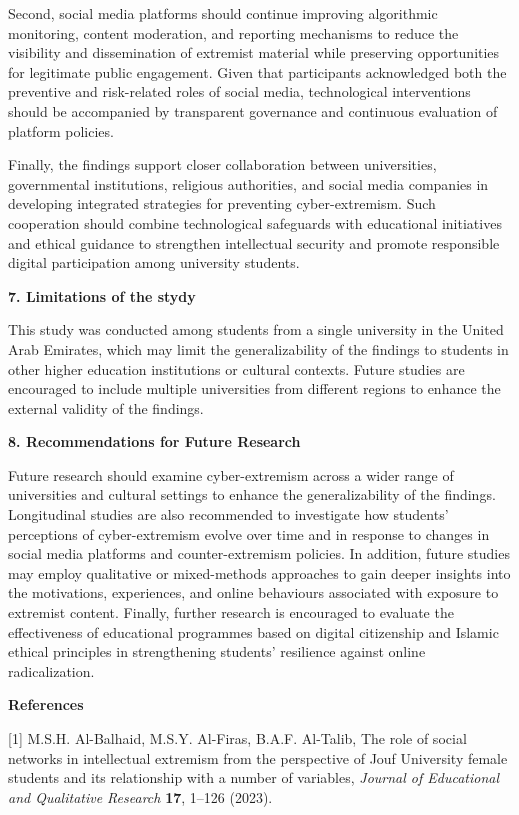 \documentclass[11pt,a4paper]{article}
\begin{document}
	Second, social media platforms should continue improving algorithmic monitoring, content moderation, and reporting mechanisms to reduce the visibility and dissemination of extremist material while preserving opportunities for legitimate public engagement. Given that participants acknowledged both the preventive and risk-related roles of social media, technological interventions should be accompanied by transparent governance and continuous evaluation of platform policies.
	
	Finally, the findings support closer collaboration between universities, governmental institutions, religious authorities, and social media companies in developing integrated strategies for preventing cyber-extremism. Such cooperation should combine technological safeguards with educational initiatives and ethical guidance to strengthen intellectual security and promote responsible digital participation among university students.
	
	\textbf{7. Limitations of the stydy}
	
	This study was conducted among students from a single university in the United Arab Emirates, which may limit the generalizability of the findings to students in other higher education institutions or cultural contexts. Future studies are encouraged to include multiple universities from different regions to enhance the external validity of the findings.
	
	\textbf{8. Recommendations for Future Research}
	
	Future research should examine cyber-extremism across a wider range of universities and cultural settings to enhance the generalizability of the findings. Longitudinal studies are also recommended to investigate how students' perceptions of cyber-extremism evolve over time and in response to changes in social media platforms and counter-extremism policies. In addition, future studies may employ qualitative or mixed-methods approaches to gain deeper insights into the motivations, experiences, and online behaviours associated with exposure to extremist content. Finally, further research is encouraged to evaluate the effectiveness of educational programmes based on digital citizenship and Islamic ethical principles in strengthening students' resilience against online radicalization.
	
	\textbf{References}
	
	[1] M.S.H. Al-Balhaid, M.S.Y. Al-Firas, B.A.F. Al-Talib, The role of social networks in intellectual extremism from the perspective of Jouf University female students and its relationship with a number of variables, \textit{Journal of Educational and Qualitative Research} \textbf{17}, 1--126 (2023).
	
\end{document}
